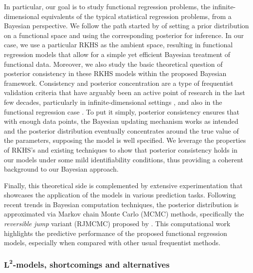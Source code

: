 \documentclass{article}
\numberwithin{equation}{section}
\theoremstyle{plain}
\theoremstyle{definition}
\begin{document}
In particular, our goal is to study functional regression problems, the infinite-dimensional equivalents of the typical statistical regression problems, from a Bayesian perspective. We follow the path started by \citet{ferguson1974prior} of setting a prior distribution on a functional space and using the corresponding posterior for inference. In our case, we use a particular RKHS as the ambient space, resulting in functional regression models that allow for a simple yet efficient Bayesian treatment of functional data. Moreover, we also study the basic theoretical question of posterior consistency in these RKHS models within the proposed Bayesian framework. Consistency and posterior concentration are a type of frequentist validation criteria that have arguably been an active point of research in the last few decades, particularly in infinite-dimensional settings \citep{amewou2003posterior, choi2008remarks}, and also in the functional regression case \citep{lian2016posterior,abraham2020posterior}. To put it simply, posterior consistency ensures that with enough data points, the Bayesian updating mechanism works as intended and the posterior distribution eventually concentrates around the true value of the parameters, supposing the model is well specified. We leverage the properties of RKHS's and existing techniques to show that posterior consistency holds in our models under some mild identifiability conditions, thus providing a coherent background to our Bayesian approach. 

Finally, this theoretical side is complemented by extensive experimentation that showcases the application of the models in various prediction tasks. Following recent trends in Bayesian computation techniques, the posterior distribution is approximated via Markov chain Monte Carlo (MCMC) methods, specifically the \textit{reversible jump} variant (RJMCMC) proposed by \citet{green1995reversible}. This computational work highlights the predictive performance of the proposed functional regression models, especially when compared with other usual frequentist methods. 

\subsubsection*{\(\bm{L^2}\)-models, shortcomings and alternatives}
\end{document}
